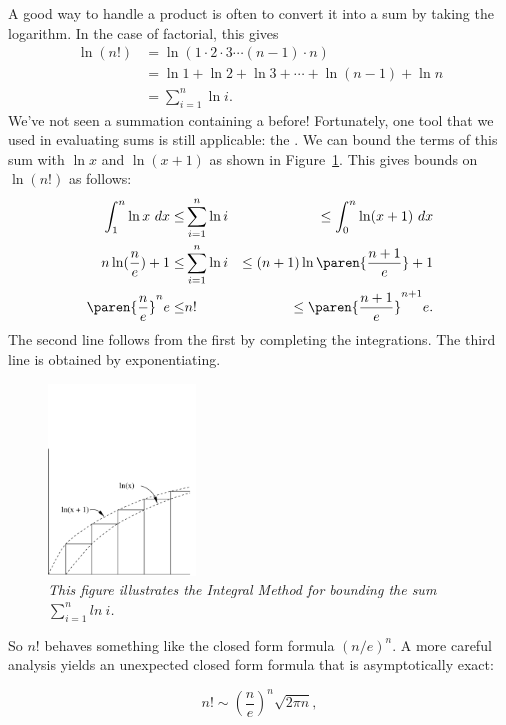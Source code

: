 A good way to handle a product is often to convert it into a sum by taking
the logarithm.  In the case of factorial, this gives
\begin{align*}
\ln (n!) 
       & =  \ln(1 \cdot 2 \cdot 3 \cdots (n-1) \cdot n) \\
       & =  \ln 1 + \ln 2 + \ln 3 + \cdots + \ln(n-1) + \ln n \\
       & =  \sum_{i=1}^n \ln i.
\end{align*}
We've not seen a summation containing a  before!
Fortunately, one tool that we used in evaluating sums is still applicable:
the .  We can bound the terms of this sum with $\ln
x$ and $\ln(x+1)$ as shown in Figure~\ref{fig:integral2}.  This gives
bounds on $\ln(n!)$ as follows:
\begin{eqnarray*}
\int_1^n \ln x \ dx \leq & \sum_{i=1}^n \ln i & \leq \int_0^n \ln(x+1) \ dx \\
n \ln(\frac{n}{e}) + 1 \leq & \sum_{i=1}^n \ln i & \leq (n+1) \ln\paren{\frac{n+1}{e}} + 1 \\
\paren{\frac{n}{e}}^n e \leq & n! & \leq  \paren{\frac{n+1}{e}}^{n+1} e.
\end{eqnarray*}
The second line follows from the first by completing the integrations.
The third line is obtained by exponentiating.

\begin{figure}[htbp]
\centerline{%
\includegraphics[height=2in]{figures/integral2}
}
\caption{\em This figure illustrates the Integral Method for bounding
the sum $\sum_{i=1}^n ln \ i$.}
\label{fig:integral2}
\end{figure}

So $n!$ behaves something like the closed form formula $(n/e)^n$.
A more careful analysis yields an unexpected closed form formula that is
asymptotically exact:
\begin{lemma*}
\begin{equation}\label{nfacsim}
n! \sim \left(\frac{n}{e}\right)^n \sqrt{2 \pi n},
\end{equation}
\end{lemma*}

